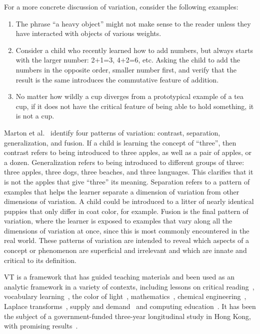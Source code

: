 For a more concrete discussion of variation, consider the following examples:
\begin{enumerate}
\item The phrase “a heavy object” might not make sense to the reader unless they have interacted with objects of various weights.
\item Consider a child who recently learned how to add numbers, but always starts with the larger number: 2+1=3, 4+2=6, etc. Asking the child to add the numbers in the opposite order, smaller number first, and verify that the result is the same introduces the commutative feature of addition.
\item No matter how wildly a cup diverges from a prototypical example of a tea cup, if it does not have the critical feature of being able to hold something, it is not a cup.
\end{enumerate}

Marton et al.~\cite{} identify four patterns of variation: contrast, separation, generalization, and fusion. If a child is learning the concept of “three”, then contrast refers to being introduced to three apples, as well as a pair of apples, or a dozen. Generalization refers to being introduced to different groups of three: three apples, three dogs, three beaches, and three languages. This clarifies that it is not the apples that give “three” its meaning. Separation refers to a pattern of examples that helps the learner separate a dimension of variation from other dimensions of variation. A child could be introduced to a litter of nearly identical puppies that only differ in coat color, for example. Fusion is the final pattern of variation, where the learner is exposed to examples that vary along all the dimensions of variation at once, since this is most commonly encountered in the real world. These patterns of variation are intended to reveal which aspects of a concept or phenomenon are superficial and irrelevant and which are innate and critical to its definition.

VT is a framework that has guided teaching materials and been used as an analytic framework in a variety of contexts, including lessons on critical reading~\cite{noble1998contents}, vocabulary learning~\cite{doi:10.1108/IJLLS-10-2014-0038}, the color of light~\cite{Ling2006}, mathematics~\cite{Pythagoras233}, chemical engineering~\cite{C2RP20145C}, Laplace transforms~\cite{carstensen2004laplace}, supply and demand~\cite{marton2006some} and computing education~\cite{suhonen2007applications}. It has been the subject of a government-funded three-year longitudinal study in Hong Kong, with promising results~\cite{lo2005each}. 

